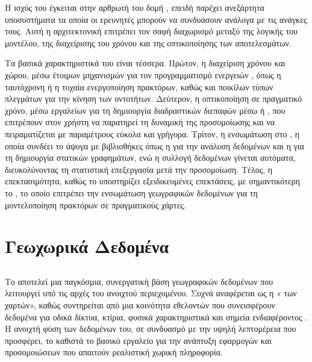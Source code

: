 Η ισχύς του  έγκειται στην αρθρωτή του δομή
, επειδή παρέχει ανεξάρτητα υποσυστήματα
τα οποία οι ερευνητές μπορούν να συνδυάσουν ανάλογα με τις ανάγκες
τους. Αυτή η αρχιτεκτονική επιτρέπει τον σαφή διαχωρισμό μεταξύ
της λογικής του μοντέλου, της διαχείρισης του χρόνου και της
οπτικοποίησης των αποτελεσμάτων.

Τα βασικά χαρακτηριστικά του  είναι τέσσερα. Πρώτον,
η διαχείριση χρόνου και χώρου, μέσω έτοιμων μηχανισμών για τον
προγραμματισμό ενεργειών , όπως η ταυτόχρονη ή η
τυχαία ενεργοποίηση πρακτόρων, καθώς και ποικίλων τύπων πλεγμάτων
 για την κίνηση των οντοτήτων. Δεύτερον, η οπτικοποίηση
σε πραγματικό χρόνο, μέσω εργαλείων για τη δημιουργία διαδραστικών
διεπαφών μέσω  ή , που επιτρέπουν
στον χρήστη να παρατηρεί τη δυναμική της προσομοίωσης και να
πειραματίζεται με παραμέτρους εύκολα και γρήγορα. Τρίτον, η
ενσωμάτωση στο , η οποία συνδέει το 
άψογα με βιβλιοθήκες όπως η  για την ανάλυση δεδομένων
και η  για τη δημιουργία στατικών γραφημάτων, ενώ η
συλλογή δεδομένων  γίνεται αυτόματα,
διευκολύνοντας τη στατιστική επεξεργασία μετά την προσομοίωση.
Τέλος, η επεκτασιμότητα, καθώς το  υποστηρίζει
εξειδικευμένες επεκτάσεις, με σημαντικότερη το , το
οποίο επιτρέπει την ενσωμάτωση γεωγραφικών δεδομένων  για
τη μοντελοποίηση πρακτόρων σε πραγματικούς χάρτες.

\section{Γεωχωρικά Δεδομένα }

\subsection{}

Το  αποτελεί μια παγκόσμια, συνεργατική
βάση γεωγραφικών δεδομένων που λειτουργεί υπό τις αρχές του
ανοιχτού περιεχομένου. Συχνά αναφέρεται ως η « των
χαρτών», καθώς συντηρείται από μια κοινότητα εθελοντών που
συνεισφέρουν δεδομένα για οδικά δίκτυα, κτίρια, φυσικά
χαρακτηριστικά και σημεία ενδιαφέροντος . Η ανοιχτή φύση των δεδομένων του, σε συνδυασμό με την
υψηλή λεπτομέρεια που προσφέρει, το καθιστά το βασικό εργαλείο για
την ανάπτυξη εφαρμογών  και προσομοιώσεων που απαιτούν
ρεαλιστική χωρική πληροφορία.

